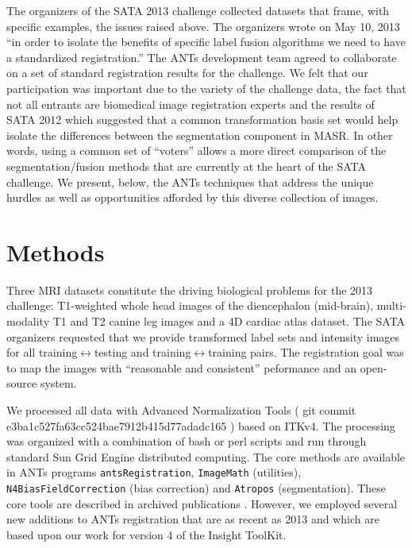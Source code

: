 \documentclass{llncs}
\begin{document}
The organizers of the SATA 2013 challenge collected datasets that
frame, with specific examples, the issues raised above.  The
organizers wrote on May 10, 2013 ``in order to isolate the benefits of
specific label fusion algorithms we need to have a standardized
registration.''  The ANTs development team agreed to collaborate on a set of standard registration results for the challenge.  We
felt that our participation was important due to the variety of the challenge
data, the fact that not all entrants are biomedical image registration
experts and the results of SATA 2012 which suggested that a common
transformation basis set would help isolate the differences between
the segmentation component in MASR.  In other words, using a common
set of ``voters'' allows a more direct comparison of the
segmentation/fusion methods that are currently at the heart of the
SATA challenge. We present,
below, the ANTs techniques that address the unique hurdles as well as
opportunities afforded by this diverse collection of images.

\section{Methods} 
Three MRI datasets constitute the driving biological problems for the
2013 challenge: T1-weighted whole head images of the diencephalon
(mid-brain), multi-modality T1 and T2 canine leg images and a 4D
cardiac atlas dataset.  The SATA organizers requested that we provide
transformed label sets and intensity images for all
training$\leftrightarrow$testing and training$\leftrightarrow$training
pairs.  The registration goal was to map the images with ``reasonable
and consistent'' peformance and an open-source system.  

We processed all data with Advanced Normalization Tools ( git commit
e3ba1c527fa63cc524bae7912b415d77adadc165 ) based on ITKv4.  The
processing was organized with a combination of bash or perl scripts
and run through standard Sun Grid Engine distributed computing.  The
core methods are available in ANTs programs \texttt{antsRegistration},
\texttt{ImageMath} (utilities), \texttt{N4BiasFieldCorrection} (bias
correction) and \texttt{Atropos} (segmentation).  These core tools are
described in archived publications
\cite{Tustison2010,Avants2011a,Avants2011}.  However, we employed
several new additions to ANTs registration that are as recent as 2013
and which are based upon our work for version 4 of the Insight
ToolKit. 
\end{document}
